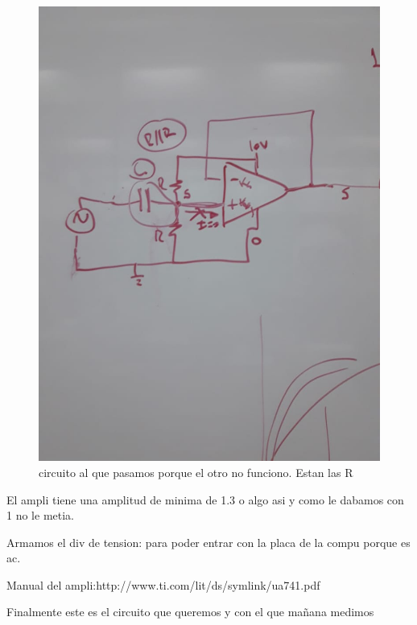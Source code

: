 \documentclass[a4paper,12pt]{article}
\begin{document}
\begin{figure}[H]
\centering
     \includegraphics[scale=0.40]{comentariogerman.jpeg}
     \caption{circuito al que pasamos porque el otro no funciono. Estan las R}
     \label{cir}
\end{figure}

El ampli tiene una amplitud de minima de 1.3 o algo asi y como le dabamos con 1 no le metia. 

Armamos el div de tension: para poder entrar con la placa de la compu porque es ac. 
 
Manual del ampli:http://www.ti.com/lit/ds/symlink/ua741.pdf 


Finalmente este es el circuito que queremos y con el que mañana medimos 
\end{document}
